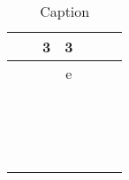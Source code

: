
\begin{table}
    \centering
    \begin{tabular}{|c|c|c|c|c|c|c|}
         &  & 3 &  3&  &  & \\  \hline
         &  &  & e &  &  & \\ \hline
         &  &  &  &  &  & \\ \hline
         &  &  &  &  &  & \\ \hline
         &  &  &  &  &  & \\ \hline
         &  &  &  &  &  & \\ \hline
         &  &  &  &  &  & \\ \hline
         &  &  &  &  &  & \\ \hline
         &  &  &  &  &  & \\ \hline
         &  &  &  &  &  & \\ \hline
         &  &  &  &  &  & \\ \hline
         &  &  &  &  &  & \\ \hline
         &  &  &  &  &  & \\ \hline
         &  &  &  &  &  & \\ \hline
         &  &  &  &  &  & \\ \hline
         &  &  &  &  &  & \\ \hline
         &  &  &  &  &  & \\ \hline
         &  &  &  &  &  & \\ \hline
    \end{tabular}
    \caption{Caption}
    \label{pugh}
\end{table}